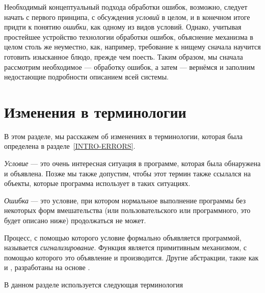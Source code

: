 Необходимый концептуальный подхода обработки ошибок, возможно, следует начать с
первого принципа, с обсуждения \emph{условий} в целом, и в конечном итоге
придти к понятию \emph{ошибки}, как одному из видов условий.
Однако, учитывая простейшее устройство технологии обработки ошибок,
объяснение механизма в целом столь же неуместно, как, например, требование к
нищему сначала научится готовить изысканное блюдо, прежде чем поесть. Таким
образом, мы сначала рассмотрим необходимое --- обработку ошибок, а затем ---
вернёмся и заполним недостающие подробности описанием всей системы.

\section{Изменения в терминологии}

В этом разделе, мы расскажем об изменениях в терминологии, которая была
определена в разделе~\ref{INTRO-ERRORS}.

\emph{Условие} --- это очень интересная ситуация в программе, которая была
обнаружена и объявлена. Позже мы также допустим, чтобы этот термин также
ссылался на объекты, которые программа использует в таких ситуациях.

\emph{Ошибка} --- это условие, при котором нормальное выполнение программы без
некоторых форм вмешательства (или пользовательского или программного, это будет
описано ниже) продолжаться не может.

Процесс, с помощью которого условие формально объявляется программой, называется
\emph{сигнализирование}. Функция  является примитивным механизмом, с
помощью которого это объявление и производится. Другие абстракции, такие как
 и , разработаны на основе .

В данном разделе используется следующая терминология

